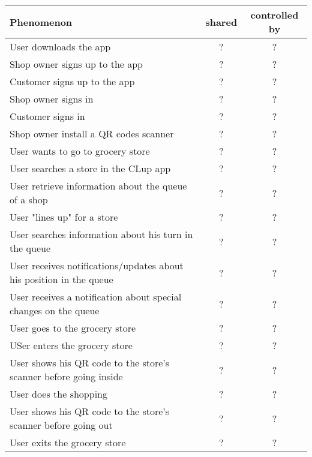 \begin{tabular}{|l|c|c|}
    \hline
    \textbf{Phenomenon} & \textbf{shared} & \textbf{controlled by}\\
    \hline
    User downloads the app & ? & ? \\
    Shop owner signs up to the app & ? & ? \\
    Customer signs up to the app & ? & ? \\
    Shop owner signs in & ? & ? \\
    Customer signs in & ? & ? \\
    Shop owner install a QR codes scanner & ? & ? \\
    \hline
    User wants to go to grocery store & ? & ? \\
    User searches a store in the CLup app & ? & ? \\
    User retrieve information about the queue of a shop & ? & ? \\
    User "lines up" for a store & ? & ? \\
    User searches information about his turn in the queue & ? & ? \\
    User receives notifications/updates about his position in the queue & ? & ? \\
    User receives a notification about special changes on the queue & ? & ? \\ %
    User goes to the grocery store & ? & ? \\
    USer enters the grocery store & ? & ? \\
    User shows his QR code to the store's scanner before going inside & ? & ? \\
    User does the shopping & ? & ? \\
    User shows his QR code to the store's scanner before going out & ? & ? \\
    User exits the grocery store & ? & ? \\
    
    

\end{tabular}
